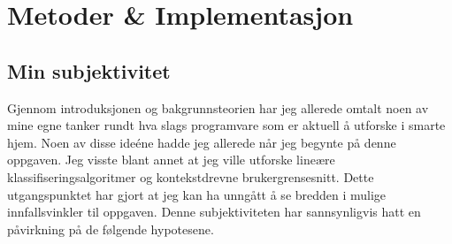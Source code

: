 \section[Metoder \& Implementasjon]{Metoder \& Implementasjon}
\subsection{Min subjektivitet}
Gjennom introduksjonen og bakgrunnsteorien har jeg allerede omtalt noen av mine egne tanker rundt hva slags programvare som er aktuell å utforske i smarte hjem. Noen av disse ideéne hadde jeg allerede når jeg begynte på denne oppgaven. Jeg visste blant annet at jeg ville utforske lineære klassifiseringsalgoritmer og kontekstdrevne brukergrensesnitt. Dette utgangspunktet har gjort at jeg kan ha unngått å se bredden i mulige innfallsvinkler til oppgaven. Denne subjektiviteten har sannsynligvis hatt en påvirkning på de følgende hypotesene.

